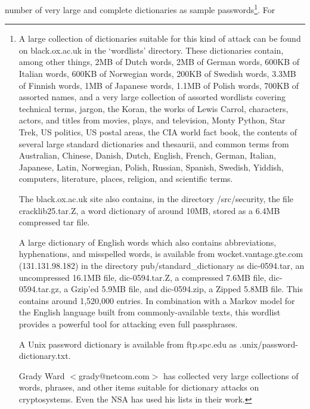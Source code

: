number of very large and complete dictionaries as sample passwords\footnote{
              	A large collection of dictionaries suitable for this kind of
              	attack can be found on black.ox.ac.uk in the `wordlists'
              	directory.  These dictionaries contain, among other things, 2MB
              	of Dutch words, 2MB of German words, 600KB of Italian words,
              	600KB of Norwegian words, 200KB of Swedish words, 3.3MB of
              	Finnish words, 1MB of Japanese words, 1.1MB of Polish words,
              	700KB of assorted names, and a very large collection of assorted
              	wordlists covering technical terms, jargon, the Koran, the works
              	of Lewis Carrol, characters, actors, and titles from movies,
              	plays, and television, Monty Python, Star Trek, US politics, US 
		postal areas, the CIA world fact book, the contents of several 
		large standard dictionaries and thesaurii, and common terms from 
		Australian, Chinese, Danish, Dutch, English, French, German, 
		Italian, Japanese, Latin, Norwegian, Polish, Russian, Spanish, 
		Swedish, Yiddish, computers, literature, places, religion, and 
		scientific terms.

              	The black.ox.ac.uk site also contains, in the directory
              	/src/security, the file cracklib25.tar.Z, a word dictionary of 
		around 10MB, stored as a 6.4MB compressed tar file.

              	A large dictionary of English words which also contains
              	abbreviations, hyphenations, and misspelled words, is available
              	from wocket.vantage.gte.com (131.131.98.182) in the 
		directory pub/standard\_dictionary as dic-0594.tar, an 
		uncompressed 16.1MB file, dic-0594.tar.Z, a compressed 7.6MB
              	file, dic-0594.tar.gz, a Gzip'ed 5.9MB file, and dic-0594.zip, a
              	Zipped 5.8MB file.  This contains around 1,520,000 entries.  In
              	combination with a Markov model for the English language built
              	from commonly-available texts, this wordlist provides a powerful
              	tool for attacking even full passphrases.

              A Unix password dictionary is available from ftp.spc.edu as
              .unix/password-dictionary.txt.

              Grady Ward $<$grady@netcom.com$>$ has collected very large
              collections of words, phrases, and other items suitable for
              dictionary attacks on cryptosystems.  Even the NSA has used his
              lists in their work.
}.  For
